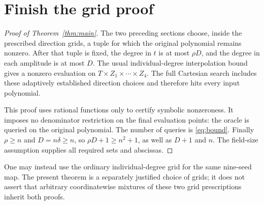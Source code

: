 \documentclass[11pt]{article}
\begin{document}
\section{Finish the grid proof}

\begin{proof}[Proof of Theorem~\ref{thm:main}]
The two preceding sections choose, inside the prescribed direction
grids, a tuple for which the original polynomial remains nonzero.
After that tuple is fixed, the degree in \(t\) is at most \(\rho D\),
and the degree in each amplitude is at most \(D\).
The usual individual-degree interpolation bound gives a nonzero
evaluation on \(T\times Z_1\times\cdots\times Z_4\).
The full Cartesian search includes these adaptively established
direction choices and therefore hits every input polynomial.

This proof uses rational functions only to certify symbolic
nonzeroness. It imposes no denominator restriction on the final
evaluation points: the oracle is queried on the original polynomial.
The number of queries is \eqref{eq:bound}.
Finally \(\rho\ge n\) and \(D=n\delta\ge n\), so
\(\rho D+1\ge n^2+1\), as well as \(D+1\) and \(n\).
The field-size assumption supplies all required sets and abscissas.
\end{proof}

One may instead use the ordinary individual-degree grid for the
same nine-seed map. The present theorem is a separately justified
choice of grids; it does not assert that arbitrary coordinatewise
mixtures of these two grid prescriptions inherit both proofs.
\end{document}
